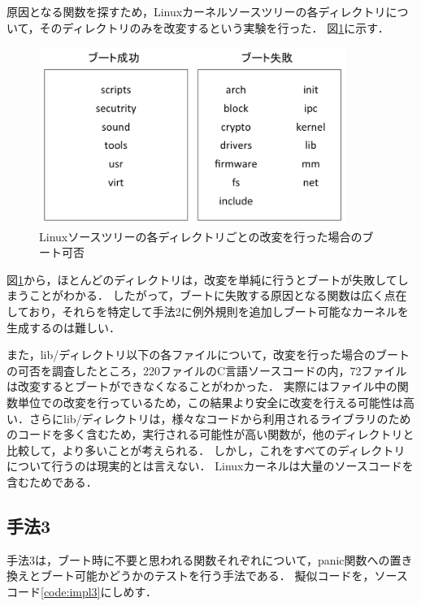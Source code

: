 \documentclass[graduation-thesis]{mlarticle}
\begin{document}
原因となる関数を探すため，Linuxカーネルソースツリーの各ディレクトリについて，そのディレクトリのみを改変するという実験を行った．
図\ref{fig:directory}に示す．

\begin{figure}[H]
  \begin{center}
    \includegraphics[width=10.0cm]{images/boottest.png}
    \caption{Linuxソースツリーの各ディレクトリごとの改変を行った場合のブート可否}
    \label{fig:directory}
  \end{center}
\end{figure}

図\ref{fig:directory}から，ほとんどのディレクトリは，改変を単純に行うとブートが失敗してしまうことがわかる．
したがって，ブートに失敗する原因となる関数は広く点在しており，それらを特定して手法2に例外規則を追加しブート可能なカーネルを生成するのは難しい．

また，lib/ディレクトリ以下の各ファイルについて，改変を行った場合のブートの可否を調査したところ，220ファイルのC言語ソースコードの内，72ファイルは改変するとブートができなくなることがわかった．
実際にはファイル中の関数単位での改変を行っているため，この結果より安全に改変を行える可能性は高い．さらにlib/ディレクトリは，様々なコードから利用されるライブラリのためのコードを多く含むため，実行される可能性が高い関数が，他のディレクトリと比較して，より多いことが考えられる．
しかし，これをすべてのディレクトリについて行うのは現実的とは言えない．
Linuxカーネルは大量のソースコードを含むためである．


\subsection{手法3}
\label{implementation:3}
手法3は，ブート時に不要と思われる関数それぞれについて，panic関数への置き換えとブート可能かどうかのテストを行う手法である．
擬似コードを，ソースコード\ref{code:impl3}にしめす．
\end{document}
